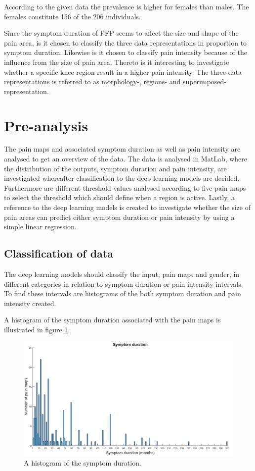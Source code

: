\noindent
According to the given data the prevalence is higher for females than males. The females constitute 156 of the 206 individuals.


\noindent
Since the symptom duration of PFP seems to affect the size and shape of the pain area, is it chosen to classify the three data representations in proportion to symptom duration. Likewise is it chosen to classify pain intensity because of the influence from the size of pain area. Thereto is it interesting to investigate whether a specific knee region result in a higher pain intensity.
The three data representations is referred to as morphology-, regions- and superimposed-representation.
\newpage

\section{Pre-analysis}
The pain maps and associated symptom duration as well as pain intensity are analysed to get an overview of the data. The data is analysed in MatLab, where the distribution of the outputs, symptom duration and pain intensity, are investigated whereafter classification to the deep learning models are decided. Furthermore are different threshold values analysed according to five pain maps to select the threshold which should define when a region is active. Lastly, a reference to the deep learning models is created to investigate whether the size of pain areas can predict either symptom duration or pain intensity by using a simple linear regression. 


\subsection{Classification of data}
The deep learning models should classify the input, pain maps and gender, in different categories in relation to symptom duration or pain intensity intervals. To find these intervals are histograms of the both symptom duration and pain intensity created. 

\noindent
A histogram of the symptom duration associated with the pain maps is illustrated in figure \ref{fig:histoduration}.

\begin{figure} [H]
\centering
\includegraphics[width=1\textwidth]{figures/histogramDuration}
\caption{A histogram of the symptom duration.}
\label{fig:histoduration}
\end{figure}

